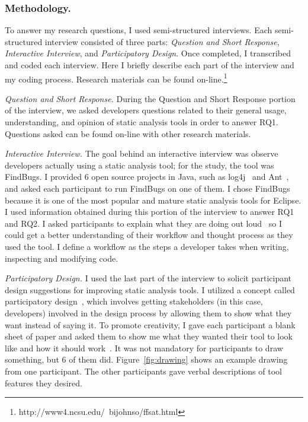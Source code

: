 \documentclass{llncs}
\begin{document}
\subsubsection{Methodology.}
To answer my research questions, I used semi-structured interviews. Each semi-structured interview consisted of three parts: \textit{Question and  Short Response}, \textit{Interactive Interview}, and \textit{Participatory Design}. Once completed, I transcribed and coded each interview. Here I briefly describe each part of the interview and my coding process.
Research materials can be found on-line.\footnote{http://www4.ncsu.edu/~bijohnso/ffsat.html}

\vspace{0.5em}
\noindent\textit{Question and Short Response.} During the Question and Short Response portion of the interview, we asked developers questions related to their general usage, understanding, and opinion of static analysis tools in order to answer RQ1. Questions asked can be found on-line with other research materials.

\vspace{0.5em}
\noindent\textit{Interactive Interview.}
The goal behind an interactive interview was observe developers actually using a static analysis tool; for the study, the tool was FindBugs. I provided 6 open source projects in Java, such as log4j~\cite{log4j} and Ant~\cite{ANT}, and asked each participant to run FindBugs on one of them. I chose FindBugs because it is one of the most popular and mature static analysis tools for Eclipse. I used information obtained during this portion of the interview to answer RQ1 and RQ2. I asked participants to explain what they are doing out loud~\cite{Lewis:1982:ThinkAloudProtocol} so I could get a better understanding of their workflow and thought process as they used the tool. I define a workflow as the steps a developer takes when writing, inspecting and modifying code.

\vspace{0.5em}
\noindent\textit{Participatory Design.}
I used the last part of the interview to solicit participant design suggestions for improving static analysis tools. I utilized a concept called participatory design~\cite{Spinuzzi:2005:Participatory}, which involves
getting stakeholders (in this case, developers) involved in the design process by allowing them to show what they want instead of saying it. To promote creativity, I gave each participant a blank sheet of paper and asked them to show me what they wanted their tool to look like and how it should work~\cite{Johnson:2012:PreFFSAT}. It was not mandatory for participants to draw something, but 6 of them did. Figure~\ref{fig:drawing} shows an example drawing from one participant. The other participants gave verbal descriptions of tool features they desired.
\end{document}
